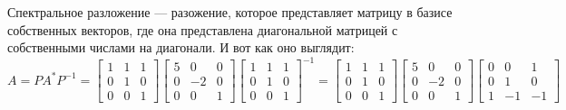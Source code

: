 \documentclass[a3paper,14pt]{extarticle}
\begin{document}
Спектральное разложение --- разожение, которое представляет матрицу в базисе собственных векторов, где она представлена диагональной матрицей с собственными числами на диагонали. И вот как оно выглядит:
$$A = PA^*P^{-1}=\begin{bmatrix}
    1 & 1 & 1 \\ 0 & 1 & 0 \\ 0 & 0 & 1
\end{bmatrix}\begin{bmatrix}
    5 & 0 & 0 \\ 0 & -2 & 0 \\ 0 & 0 & 1
\end{bmatrix}\begin{bmatrix}
    1 & 1 & 1 \\ 0 & 1 & 0 \\ 0 & 0 & 1
\end{bmatrix}^{-1}=\begin{bmatrix}
    1 & 1 & 1 \\ 0 & 1 & 0 \\ 0 & 0 & 1
\end{bmatrix}\begin{bmatrix}
    5 & 0 & 0 \\ 0 & -2 & 0 \\ 0 & 0 & 1
\end{bmatrix}\begin{bmatrix}
    0 & 0 & 1 \\ 0 & 1 & 0 \\ 1 & -1 & -1
\end{bmatrix}$$\pagebreak
\end{document}
